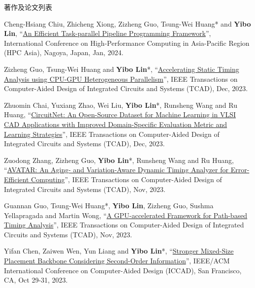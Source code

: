 \begin{rSection}{著作及论文列表}
\begin{description}[font=\normalfont, rightmargin=2em]
{}
            

\item[{[C134]}]{
        Cheng-Hsiang Chiu, Zhicheng Xiong, Zizheng Guo, Tsung-Wei Huang* and \textbf{Yibo Lin}, 
    ``\href{https://doi.org/10.1145/3635035.3635037}{An Efficient Task-parallel Pipeline Programming Framework}'', 
    International Conference on High-Performance Computing in Asia-Pacific Region (HPC Asia), Nagoya, Japan, Jan, 2024.
    
}
            

\item[{[J133]}]{
        Zizheng Guo, Tsung-Wei Huang and \textbf{Yibo Lin}*, 
    ``\href{https://doi.org/10.1109/TCAD.2023.3286261}{Accelerating Static Timing Analysis using CPU-GPU Heterogeneous Parallelism}'', 
    IEEE Transactions on Computer-Aided Design of Integrated Circuits and Systems (TCAD), Dec, 2023.
    
}
            

\item[{[J132]}]{
        Zhuomin Chai, Yuxiang Zhao, Wei Liu, \textbf{Yibo Lin}*, Runsheng Wang and Ru Huang, 
    ``\href{https://doi.org/10.1109/TCAD.2023.3287970}{CircuitNet: An Open-Source Dataset for Machine Learning in VLSI CAD Applications with Improved Domain-Specific Evaluation Metric and Learning Strategies}'', 
    IEEE Transactions on Computer-Aided Design of Integrated Circuits and Systems (TCAD), Dec, 2023.
    
}
            

\item[{[J131]}]{
        Zuodong Zhang, Zizheng Guo, \textbf{Yibo Lin}*, Runsheng Wang and Ru Huang, 
    ``\href{https://doi.org/10.1109/TCAD.2023.3255167}{AVATAR: An Aging- and Variation-Aware Dynamic Timing Analyzer for Error-Efficient Computing}'', 
    IEEE Transactions on Computer-Aided Design of Integrated Circuits and Systems (TCAD), Nov, 2023.
    
}
            

\item[{[J130]}]{
        Guannan Guo, Tsung-Wei Huang*, \textbf{Yibo Lin}, Zizheng Guo, Sushma Yellapragada and Martin Wong, 
    ``\href{https://doi.org/10.1109/TCAD.2023.3272274}{A GPU-accelerated Framework for Path-based Timing Analysis}'', 
    IEEE Transactions on Computer-Aided Design of Integrated Circuits and Systems (TCAD), Nov, 2023.
    
}
            

\item[{[C129]}]{
        Yifan Chen, Zaiwen Wen, Yun Liang and \textbf{Yibo Lin}*, 
    ``\href{https://doi.org/10.1109/ICCAD57390.2023.10323700}{Stronger Mixed-Size Placement Backbone Considering Second-Order Information}'', 
    IEEE/ACM International Conference on Computer-Aided Design (ICCAD), San Francisco, CA, Oct 29-31, 2023.
    
}
\end{description}
\end{rSection}

